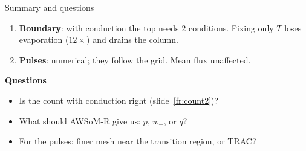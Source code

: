 \documentclass[aspectratio=169,11pt]{beamer}
\begin{document}
\begin{frame}{Summary and questions}
  \begin{enumerate}
    \item \textbf{Boundary}: with conduction the top needs 2 conditions. Fixing only $T$
          loses evaporation ($12\times$) and drains the column.
    \item \textbf{Pulses}: numerical; they follow the grid. Mean flux unaffected.
  \end{enumerate}
  \vspace{0.8em}
  \textbf{Questions}
  \begin{itemize}
    \item Is the count with conduction right (slide~\ref{fr:count2})?
    \item What should AWSoM-R give us: $p$, $w_-$, or $q$?
    \item For the pulses: finer mesh near the transition region, or TRAC?
  \end{itemize}
\end{frame}
\end{document}

